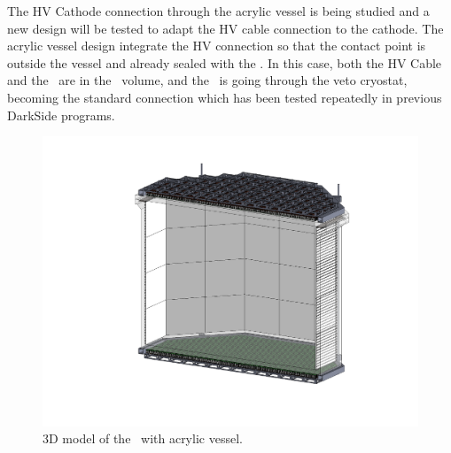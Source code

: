 The HV Cathode connection through the acrylic vessel is being studied and a new design will be tested to adapt the HV cable connection to the cathode. The acrylic vessel design integrate the HV connection so that the contact point is outside the vessel and already sealed with the \UAr. In this case, both the HV Cable and the \HVFT\ are in the \AAr\ volume, and the \HVFT\ is going through the veto cryostat, becoming the standard connection which has been tested repeatedly in previous DarkSide programs. 

\begin{figure}[h!]
\centering
\includegraphics[width=\columnwidth]{./Figures/TPC-acrylic-vessel-design.pdf}
\caption{3D model of the \TPC\ with acrylic vessel.}
\label{fig:TPC_acrylic}
\end{figure}